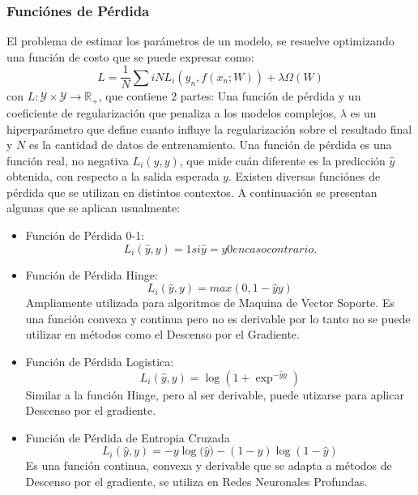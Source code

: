 \documentclass[a4paper,11pt,spanish]{book}
\begin{document}
	\subsubsection{Funciónes de Pérdida}
	  El problema de estimar los parámetros de un modelo, se resuelve optimizando una función de costo que se puede expresar como:
          \begin{equation}
	    L = \frac{1}{N}\sum{i}{N} L_i(y_n, f(x_n; W)) + \lambda \Omega(W)
          \end{equation}
          con $L:\mathcal{Y}\times \mathcal{Y}\rightarrow\mathbb{R}_+$, que contiene 2 partes: Una función de pérdida y un coeficiente de regularización que penaliza a los modelos complejos,
          $\lambda$ es un hiperparámetro que define cuanto influye la regularización sobre el resultado final y $N$ es la cantidad de datos de entrenamiento.
	  Una función de pérdida es una función real, no negativa $L_i({\widehat y}, y)$, que mide cuán diferente es la predicción ${\widehat y}$ obtenida, con respecto a la
	  salida esperada $y$. Existen diversas funciónes de pérdida que se utilizan en distintos contextos. A continuación se presentan algunas que se aplican usualmente:
	  \begin{itemize}
	    \item Función de Pérdida 0-1:
	      \begin{equation}
		L_i({\widehat y}, y) =  1 si {\widehat y} = y 0 en caso contrario.
	      \end{equation}
	    \item Función de Pérdida Hinge:
	      \begin{equation}
		L_i({\widehat y}, y) =  max(0, 1 - {\widehat y}y)
	      \end{equation}
	      Ampliamente utilizada para algoritmos de Maquina de Vector Soporte.
	      Es una función convexa y continua pero no es derivable por lo tanto no se puede utilizar en métodos como el Descenso por el Gradiente.
	    \item Función de Pérdida Logistica:
	      \begin{equation}
		L_i({\widehat y}, y) =  {\log(1+ {\exp^{-{\widehat y}y}})}
	      \end{equation}
	      Similar a la función Hinge, pero al ser derivable, puede utizarse para aplicar Descenso por el gradiente.
	    \item Función de Pérdida de Entropia Cruzada
	      \begin{equation}
		L_i({\widehat y}, y) = -y{\log({\widehat y}}) - (1-y) {\log(1-{\widehat y})}
	      \end{equation}
	      Es una función continua, convexa y derivable que se adapta a métodos de Descenso por el gradiente, se utiliza en Redes Neuronales Profundas.

	  \end{itemize}
\end{document}
